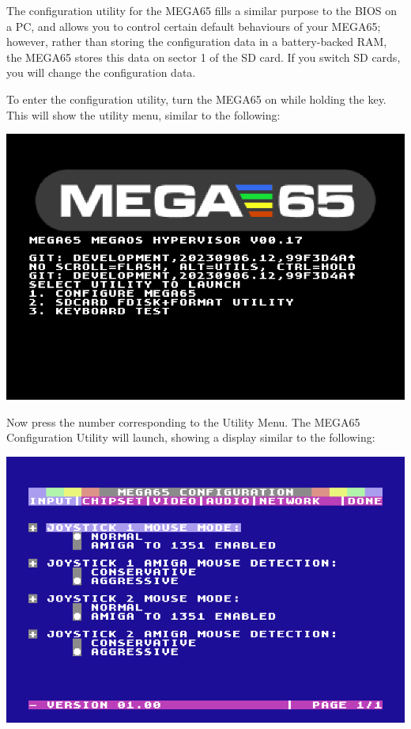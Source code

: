 The configuration utility for the MEGA65 fills a similar purpose to the BIOS on a PC, and allows you to control certain default behaviours of your MEGA65; however, rather than storing the configuration data in a
battery-backed RAM, the MEGA65 stores this data on sector 1 of the SD card. If you switch SD cards, you will change the configuration data.

  To enter the configuration utility, turn the MEGA65 on while
  holding the  key.  This will show the utility menu,
  similar to the following:

\begin{center}
  \includegraphics[width=0.9\linewidth]{images/ss-utilmenu.png}
\end{center}

\begin{minipage}{\linewidth}
  Now press the number corresponding to the Utility Menu.  The MEGA65
  Configuration Utility will launch, showing a display similar to
  the following:

  \vspace{5mm}
  \includegraphics[width=\linewidth]{images/ss-m65config-1.png}
\end{minipage}

